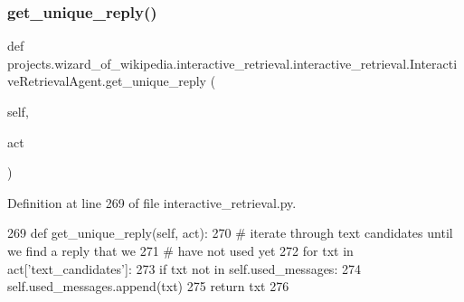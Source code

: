 \subsubsection{\texorpdfstring{get\+\_\+unique\+\_\+reply()}{get\_unique\_reply()}}
{\footnotesize\ttfamily def projects.\+wizard\+\_\+of\+\_\+wikipedia.\+interactive\+\_\+retrieval.\+interactive\+\_\+retrieval.\+Interactive\+Retrieval\+Agent.\+get\+\_\+unique\+\_\+reply (\begin{DoxyParamCaption}\item[{}]{self,  }\item[{}]{act }\end{DoxyParamCaption})}



Definition at line 269 of file interactive\+\_\+retrieval.\+py.


\begin{DoxyCode}
269     \textcolor{keyword}{def }get\_unique\_reply(self, act):
270         \textcolor{comment}{# iterate through text candidates until we find a reply that we}
271         \textcolor{comment}{# have not used yet}
272         \textcolor{keywordflow}{for} txt \textcolor{keywordflow}{in} act[\textcolor{stringliteral}{'text\_candidates'}]:
273             \textcolor{keywordflow}{if} txt \textcolor{keywordflow}{not} \textcolor{keywordflow}{in} self.used\_messages:
274                 self.used\_messages.append(txt)
275                 \textcolor{keywordflow}{return} txt
276 
\end{DoxyCode}
\mbox{\label{classprojects_1_1wizard__of__wikipedia_1_1interactive__retrieval_1_1interactive__retrieval_1_1InteractiveRetrievalAgent_ab919b6e7df181e5d64747cd11d45e085}} 
